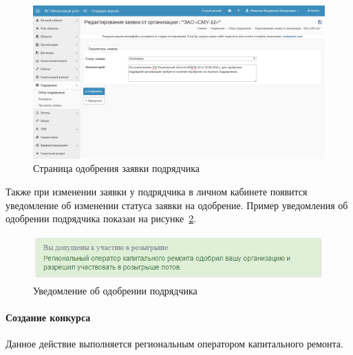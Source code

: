 \begin{figure}[h!]
	\begin{center}
		\begin{minipage}[h]{\linewidth}
			\centering
			\includegraphics[width=\linewidth]{images/software-hmRequest.png}
			\caption{Страница одобрения заявки подрядчика}
			\label{img:software-hmRequest}
		\end{minipage}
		\hfill
	\end{center}
\end{figure}

Также при изменении заявки у подрядчика в личном кабинете появится уведомление об изменении статуса заявки на одобрение.
Пример уведомления об одобрении подрядчика показан на рисунке~\ref{img:software-contractorRequestNotify}.

\begin{figure}[h!]
	\begin{center}
		\begin{minipage}[h]{\linewidth}
			\centering
			\includegraphics[width=\linewidth]{images/software-contractorRequestNotify.png}
			\caption{Уведомление об одобрении подрядчика}
			\label{img:software-contractorRequestNotify}
		\end{minipage}
		\hfill
	\end{center}
\end{figure}

\paragraph{Создание конкурса}

Данное действие выполняется региональным оператором капитального ремонта.

